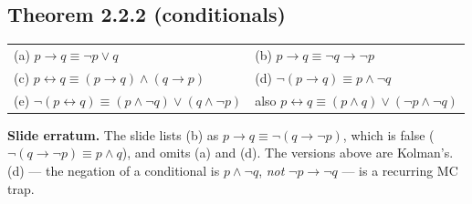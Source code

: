 \documentclass{fkt-notes}
\newcommand{\erratum}[1]{\par\noindent\textbf{Slide erratum.} #1\par}
\theoremstyle{definition}
\begin{document}
\subsection{Theorem 2.2.2 (conditionals)}
%
\begin{rulebox}
  \begin{tabular}{@{}ll@{}}
    (a) $p\to q\equiv\neg p\vee q$                                         &
    (b) $p\to q\equiv\neg q\to\neg p$                                        \\
    (c) $p\leftrightarrow q\equiv(p\to q)\wedge(q\to p)$                   &
    (d) $\neg(p\to q)\equiv p\wedge\neg q$                                   \\
    (e) $\neg(p\leftrightarrow q)\equiv(p\wedge\neg q)\vee(q\wedge\neg p)$ &
    also $p\leftrightarrow q\equiv(p\wedge q)\vee(\neg p\wedge\neg q)$
  \end{tabular}
\end{rulebox}
\erratum{The slide lists (b) as $p\to q\equiv\neg(q\to\neg p)$, which is
  false ($\neg(q\to\neg p)\equiv p\wedge q$), and omits (a) and (d). The
  versions above are Kolman's. (d) --- the negation of a conditional is
  $p\wedge\neg q$, \emph{not} $\neg p\to\neg q$ --- is a recurring MC trap.}

\end{document}
